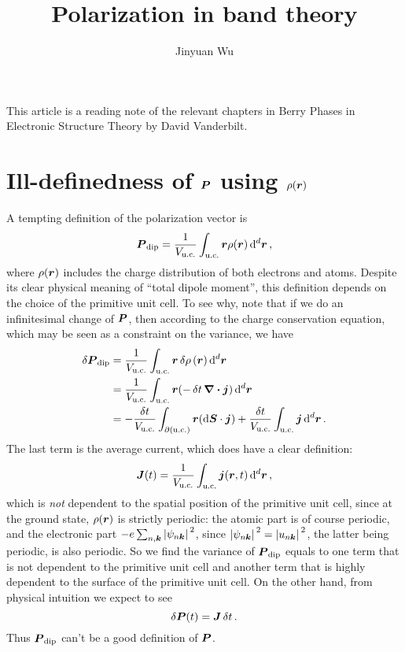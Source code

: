 \documentclass[hyperref, a4paper]{article}
\title{Polarization in band theory}
\author{Jinyuan Wu}
\begin{document}
\maketitle

This article is a reading note of the relevant chapters in Berry Phases in Electronic Structure Theory
by David Vanderbilt.

\section{Ill-definedness of $\vb*{P}$ using $\rho(\vb*{r})$}

A tempting definition of the polarization vector is 
\begin{equation}
    \vb*{P}_{\text{dip}} = \frac{1}{V_{\text{u.c.}}} \int_{\text{u.c.}} \vb*{r} \rho(\vb*{r}) \dd[d]{\vb*{r}},
\end{equation}
where $\rho(\vb*{r})$ includes the charge distribution 
of both electrons and atoms.
Despite its clear physical meaning of ``total dipole moment'',
this definition depends on the choice of the primitive unit cell. 
To see why, note that if we do an infinitesimal change of $\vb*{P}$,
then according to the charge conservation equation, 
which may be seen as a constraint on the variance, 
we have 
\begin{equation}
    \begin{aligned}
        \var{\vb*{P}}_{\text{dip}} &= 
        \frac{1}{V_{\text{u.c.}}} \int_{\text{u.c.}} \vb*{r} \var{\rho}(\vb*{r}) \dd[d]{\vb*{r}} \\
        &= \frac{1}{V_{\text{u.c.}}} \int_{\text{u.c.}} \vb*{r} (- \var{t} \div{\vb*{j}}) \dd[d]{\vb*{r}} \\
        &= - \frac{\var{t}}{V_{\text{u.c.}}} \int_{\partial(\text{u.c.})} \vb*{r} (\dd{\vb*{S}} \cdot \vb*{j})
        + \frac{\var{t}}{V_{\text{u.c.}}} \int_{\text{u.c.}} \vb*{j} \dd[d]{\vb*{r}}.
    \end{aligned}
    \label{eq:naive-def-problem}
\end{equation}
The last term is the average current,
which does have a clear definition: 
\begin{equation}
    \vb*{J}(t) = \frac{1}{V_{\text{u.c.}}} \int_{\text{u.c.}} \vb*{j}(\vb*{r}, t) \dd[d]{\vb*{r}},
\end{equation}
which is \emph{not} dependent to the spatial position of the primitive unit cell, 
since at the ground state, 
$\rho(\vb*{r})$ is strictly periodic:
the atomic part is of course periodic,
and the electronic part $- e \sum_{n, \vb*{k}} \abs*{\psi_{n \vb*{k}}}^2$,
since $\abs*{\psi_{n \vb*{k}}}^2 = \abs*{u_{n \vb*{k}}}^2$,
the latter being periodic, 
is also periodic.
So we find the variance of $\vb*{P}_{\text{dip}}$ 
equals to one term that is not dependent to the primitive unit cell 
and another term that is highly dependent to the surface 
of the primitive unit cell. 
On the other hand, from physical intuition we expect to see 
\begin{equation}
    \var{\vb*{P}(t)} = \vb*{J} \var{t}.
    \label{eq:j-is-derivative-of-p}
\end{equation}
Thus $\vb*{P}_{\text{dip}}$ can't be a good definition of $\vb*{P}$.
\end{document}
